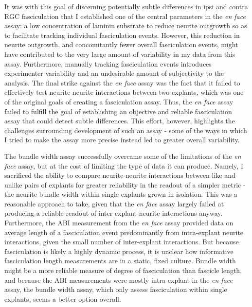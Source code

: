 It was with this goal of discerning potentially subtle differences in ipsi and contra RGC fasciculation that I established one of the central parameters in the \emph{en face} assay: a low concentration of laminin substrate to reduce neurite outgrowth so as to facilitate tracking individual fasciculation events.
However, this reduction in neurite outgrowth, and concomitantly fewer overall fasciculation events, might have contributed to the very large amount of variability in my data from this assay.
Furthermore, manually tracking fasciculation events introduces experimenter variability and an undesirable amount of subjectivity to the analysis.
The final strike against the \emph{en face} assay was the fact that it failed to effectively test neurite-neurite interactions between two explants, which was one of the original goals of creating a fasciculation assay.
Thus, the \emph{en face} assay failed to fulfill the goal of establishing an objective and reliable fasciculation assay that could detect subtle differences.
This effort, however, highlights the challenges surrounding development of such an assay - some of the ways in which I tried to make the assay more precise instead led to greater overall variability.

The bundle width assay successfully overcame some of the limitations of the \emph{en face} assay, but at the cost of limiting the type of data it can produce.
Namely, I sacrificed the ability to compare neurite-neurite interactions between like and unlike pairs of explants for greater reliability in the readout of a simpler metric - the neurite bundle width within single explants grown in isolation.
This was a reasonable approach to take, given that the \emph{en face} assay largely failed at producing a reliable readout of inter-explant neurite interactions anyway.
Furthermore, the ABI measurement from the \emph{en face} assay provided data on average length of a fasciculation event predominantly from intra-explant neurite interactions, given the small number of inter-explant interactions.
But because fasciculation is likely a highly dynamic process, it is unclear how informative fasciculation length measurements are in a static, fixed culture.
Bundle width might be a more reliable measure of degree of fasciculation than fascicle length, and because the ABI measurements were mostly intra-explant in the \emph{en face} assay, the bundle width assay, which only assess fasciculation within single explants, seems a better option overall.

